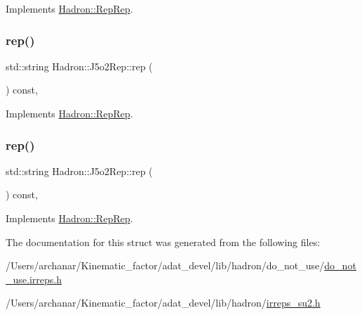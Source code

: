Implements \mbox{\hyperlink{structHadron_1_1RepRep_ab3213025f6de249f7095892109575fde}{Hadron\+::\+Rep\+Rep}}.

\mbox{\label{structHadron_1_1J5o2Rep_a43d3fc5ff7f61a64d8dac3b700b2c140}} 
\subsubsection{\texorpdfstring{rep()}{rep()}\hspace{0.1cm}{\footnotesize\ttfamily [2/3]}}
{\footnotesize\ttfamily std\+::string Hadron\+::\+J5o2\+Rep\+::rep (\begin{DoxyParamCaption}{ }\end{DoxyParamCaption}) const\hspace{0.3cm}{\ttfamily [inline]}, {\ttfamily [virtual]}}



Implements \mbox{\hyperlink{structHadron_1_1RepRep_ab3213025f6de249f7095892109575fde}{Hadron\+::\+Rep\+Rep}}.

\mbox{\label{structHadron_1_1J5o2Rep_a43d3fc5ff7f61a64d8dac3b700b2c140}} 
\subsubsection{\texorpdfstring{rep()}{rep()}\hspace{0.1cm}{\footnotesize\ttfamily [3/3]}}
{\footnotesize\ttfamily std\+::string Hadron\+::\+J5o2\+Rep\+::rep (\begin{DoxyParamCaption}{ }\end{DoxyParamCaption}) const\hspace{0.3cm}{\ttfamily [inline]}, {\ttfamily [virtual]}}



Implements \mbox{\hyperlink{structHadron_1_1RepRep_ab3213025f6de249f7095892109575fde}{Hadron\+::\+Rep\+Rep}}.



The documentation for this struct was generated from the following files\+:\begin{DoxyCompactItemize}
\item 
/\+Users/archanar/\+Kinematic\+\_\+factor/adat\+\_\+devel/lib/hadron/do\+\_\+not\+\_\+use/\mbox{\hyperlink{do__not__use_8irreps_8h}{do\+\_\+not\+\_\+use.\+irreps.\+h}}\item 
/\+Users/archanar/\+Kinematic\+\_\+factor/adat\+\_\+devel/lib/hadron/\mbox{\hyperlink{lib_2hadron_2irreps__su2_8h}{irreps\+\_\+su2.\+h}}\end{DoxyCompactItemize}
